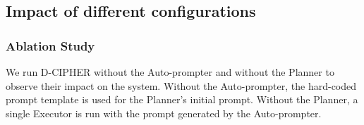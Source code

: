 \subsection{Impact of different configurations}





\subsubsection{Ablation Study}
\label{sec:ablation}

We run D-CIPHER without the Auto-prompter and without the Planner to observe their impact on the system.
Without the Auto-prompter, the hard-coded prompt template is used for the Planner's initial prompt.
Without the Planner, a single Executor is run with the prompt generated by the Auto-prompter.

